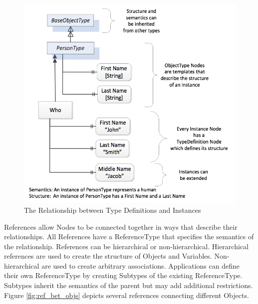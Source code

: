 \documentclass{mtconnect}	%
\begin{document}
\begin{figure}[h]
  \centering
  \includegraphics[width=1.0\textwidth]{diagrams/RelsBetweenTypesAndInstances.png}
  \caption{The Relationship between Type Definitions and Instances }
  \label{fig:rel_type_inst}
\end{figure}

References allow Nodes to be connected together in ways that describe their relationships. All References have a ReferenceType that specifies the semantics of the relationship. References can be hierarchical or non-hierarchical. Hierarchical references are used to create the structure of Objects and Variables. Non-hierarchical are used to create arbitrary associations. Applications can define their own ReferenceType by creating Subtypes of the existing ReferenceType. Subtypes inherit the semantics of the parent but may add additional restrictions. Figure \ref{fig:ref_bet_objs} depicts several references connecting different Objects.
\end{document}
